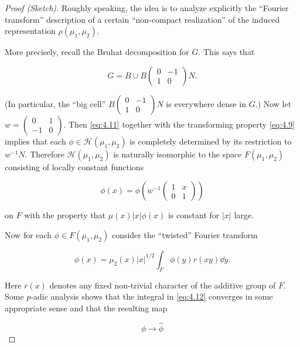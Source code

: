 \begin{proof}[Proof (Sketch)]

Roughly speaking, the idea is to analyze explicitly the ``Fourier transform'' description of a certain ``non-compact realization'' of the induced representation $\rho(\mu_1, \mu_2)$.

More precisely, recall the Bruhat decomposition for $G$. This says that

\begin{equation}\label{eq:4.11}
G = B \cup B \begin{pmatrix} 0 & -1 \\ 1 & 0 \end{pmatrix} N.\tag{4.11}
\end{equation}

(In particular, the ``big cell'' $B\begin{pmatrix} 0 & -1 \\ 1 & 0 \end{pmatrix}N$ is everywhere dense in $G$.) Now let $w = \begin{pmatrix} 0 & 1 \\ -1 & 0 \end{pmatrix}$. Then \eqref{eq:4.11} together with the transforming property \eqref{eq:4.9} implies that each $\phi \in \mathcal{H}(\mu_1, \mu_2)$ is completely determined by its restriction to $w^{-1}N$. Therefore $\mathcal{H}(\mu_1, \mu_2)$ is naturally isomorphic to the space $F(\mu_1, \mu_2)$ consisting of locally constant functions

\[
\phi(x) = \phi\!\left(w^{-1}\begin{pmatrix} 1 & x \\ 0 & 1 \end{pmatrix}\right)
\]

on $F$ with the property that $\mu(x)|x|\phi(x)$ is constant for $|x|$ large.

Now for each $\phi \in F(\mu_1, \mu_2)$ consider the ``twisted'' Fourier transform

\begin{equation}\label{eq:4.12}
\hat{\phi}(x) = \mu_2(x)|x|^{1/2}\int_F \phi(y)r(xy)\dd y.\tag{4.12}
\end{equation}

Here $r(x)$ denotes any fixed non-trivial character of the additive group of $F$. Some $p$-adic analysis shows that the integral in \eqref{eq:4.12} converges in some appropriate sense and that the resulting map

\begin{equation}\label{eq:4.13}
\phi \to \hat{\phi}\tag{4.13}
\end{equation}


\end{proof}
